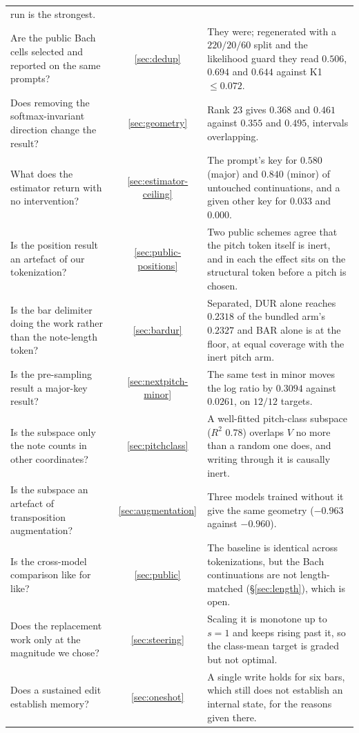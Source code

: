 \documentclass{article}
\begin{document}
\begin{table}[!h]
\begin{tabular}{@{}p{}cp{}@{}}
   run is the strongest.\\
Are the public Bach cells selected and reported on the same prompts?
 & \ref{sec:dedup} & They were; regenerated with a $220/20/60$ split and the
   likelihood guard they read $0.506$, $0.694$ and $0.644$ against K1 $\le 0.072$.\\
Does removing the softmax-invariant direction change the result?
 & \ref{sec:geometry} & Rank $23$ gives $0.368$ and $0.461$ against $0.355$ and
   $0.495$, intervals overlapping.\\
What does the estimator return with no intervention?
 & \ref{sec:estimator-ceiling} & The prompt's key for $0.580$ (major) and $0.840$
   (minor) of untouched continuations, and a given other key for $0.033$ and $0.000$.\\
Is the position result an artefact of our tokenization?
 & \ref{sec:public-positions} & Two public schemes agree that the pitch token itself
   is inert, and in each the effect sits on the structural token before a pitch is
   chosen.\\
Is the bar delimiter doing the work rather than the note-length token?
 & \ref{sec:bardur} & Separated, DUR alone reaches $0.2318$ of the bundled arm's
   $0.2327$ and BAR alone is at the floor, at equal coverage with the inert pitch
   arm.\\
Is the pre-sampling result a major-key result?
 & \ref{sec:nextpitch-minor} & The same test in minor moves the log ratio by
   $0.3094$ against $0.0261$, on $12/12$ targets.\\
Is the subspace only the note counts in other coordinates?
 & \ref{sec:pitchclass} & A well-fitted pitch-class subspace ($R^2$ $0.78$) overlaps
   $V$ no more than a random one does, and writing through it is causally inert.\\
Is the subspace an artefact of transposition augmentation?
 & \ref{sec:augmentation} & Three models trained without it give the same geometry
   ($-0.963$ against $-0.960$).\\
Is the cross-model comparison like for like?
 & \ref{sec:public} & The baseline is identical across tokenizations, but the
   Bach continuations are not length-matched (§\ref{sec:length}), which is open.\\
Does the replacement work only at the magnitude we chose?
 & \ref{sec:steering} & Scaling it is monotone up to $s=1$ and keeps rising past
   it, so the class-mean target is graded but not optimal.\\
Does a sustained edit establish memory?
 & \ref{sec:oneshot} & A single write holds for six bars, which still does not
   establish an internal state, for the reasons given there.\\
\bottomrule
\end{tabular}
\end{table}
\end{document}
